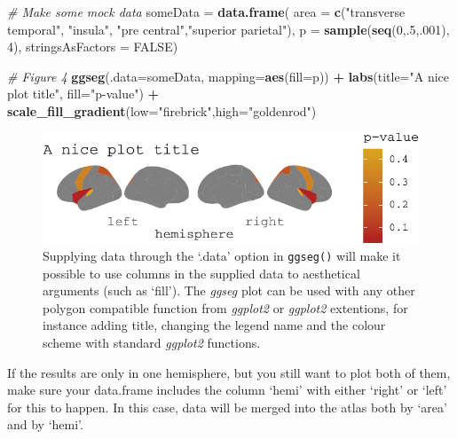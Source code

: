 \documentclass[fleqn,10pt]{wlpeerj} %
\newenvironment{Shaded}{\begin{snugshade}}{\end{snugshade}}
\newcommand{\CommentTok}[1]{\textcolor[rgb]{0.56,0.35,0.01}{\textit{#1}}}
\newcommand{\DataTypeTok}[1]{\textcolor[rgb]{0.13,0.29,0.53}{#1}}
\newcommand{\DecValTok}[1]{\textcolor[rgb]{0.00,0.00,0.81}{#1}}
\newcommand{\KeywordTok}[1]{\textcolor[rgb]{0.13,0.29,0.53}{\textbf{#1}}}
\newcommand{\NormalTok}[1]{#1}
\newcommand{\OperatorTok}[1]{\textcolor[rgb]{0.81,0.36,0.00}{\textbf{#1}}}
\newcommand{\OtherTok}[1]{\textcolor[rgb]{0.56,0.35,0.01}{#1}}
\newcommand{\StringTok}[1]{\textcolor[rgb]{0.31,0.60,0.02}{#1}}
\begin{document}
\begin{Shaded}
\begin{Highlighting}[]
\CommentTok{\# Make some mock data}
\NormalTok{someData =}\StringTok{ }\KeywordTok{data.frame}\NormalTok{(}
  \DataTypeTok{area =} \KeywordTok{c}\NormalTok{(}\StringTok{"transverse temporal"}\NormalTok{, }\StringTok{"insula"}\NormalTok{,}
           \StringTok{"pre central"}\NormalTok{,}\StringTok{"superior parietal"}\NormalTok{),}
  \DataTypeTok{p =} \KeywordTok{sample}\NormalTok{(}\KeywordTok{seq}\NormalTok{(}\DecValTok{0}\NormalTok{,.}\DecValTok{5}\NormalTok{,.}\DecValTok{001}\NormalTok{), }\DecValTok{4}\NormalTok{),}
  \DataTypeTok{stringsAsFactors =} \OtherTok{FALSE}\NormalTok{)}

\CommentTok{\# Figure 4}
\KeywordTok{ggseg}\NormalTok{(}\DataTypeTok{.data=}\NormalTok{someData, }\DataTypeTok{mapping=}\KeywordTok{aes}\NormalTok{(}\DataTypeTok{fill=}\NormalTok{p))  }\OperatorTok{+}
\StringTok{  }\KeywordTok{labs}\NormalTok{(}\DataTypeTok{title=}\StringTok{"A nice plot title"}\NormalTok{, }\DataTypeTok{fill=}\StringTok{"p{-}value"}\NormalTok{) }\OperatorTok{+}
\StringTok{  }\KeywordTok{scale\_fill\_gradient}\NormalTok{(}\DataTypeTok{low=}\StringTok{"firebrick"}\NormalTok{,}\DataTypeTok{high=}\StringTok{"goldenrod"}\NormalTok{)}
\end{Highlighting}
\end{Shaded}

\begin{figure}
\centering
\includegraphics{draft_2_files/figure-latex/datasupp-1.pdf}
\caption{\label{fig:datasupp}Supplying data through the `.data' option in \texttt{ggseg()} will make it possible to use columns in the supplied data to aesthetical arguments (such as `fill'). The \emph{ggseg} plot can be used with any other polygon compatible function from \emph{ggplot2} or \emph{ggplot2} extentions, for instance adding title, changing the legend name and the colour scheme with standard \emph{ggplot2} functions.}
\end{figure}

If the results are only in one hemisphere, but you still want to plot both of them, make sure your data.frame includes the column `hemi' with either `right' or `left' for this to happen.
In this case, data will be merged into the atlas both by `area' and by `hemi'.
\end{document}
